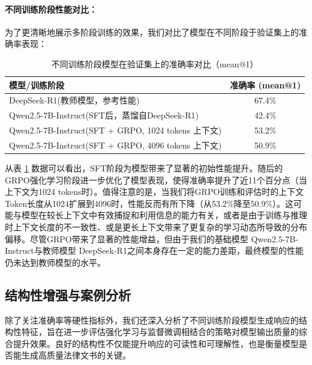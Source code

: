 \documentclass{article}
\newcommand{\qwen}{Qwen2.5-7B-Instruct}
\newcommand{\deepseekr}{DeepSeek-R1}
\newcommand{\qwen}{Qwen2.5-7B-Instruct}
\newcommand{\deepseekr}{DeepSeek-R1}
\begin{document}
\paragraph{不同训练阶段性能对比：}
为了更清晰地展示多阶段训练的效果，我们对比了模型在不同阶段于验证集上的准确率表现：

\begin{table}[h]
\centering
\caption{不同训练阶段模型在验证集上的准确率对比（mean@1）}
\label{tab:acc_distill_sft_grpo}
\begin{tabular}{l|c}
\hline
模型/训练阶段 & 准确率 (mean@1) \\
\hline
\deepseekr (教师模型，参考性能) & 67.4\% \\
\qwen (SFT后，蒸馏自\deepseekr) & 42.4\% \\
\qwen (SFT + GRPO, 1024 tokens 上下文) & 53.2\% \\
\qwen (SFT + GRPO, 4096 tokens 上下文) & 50.9\% \\
\hline
\end{tabular}
\end{table}

从表 \ref{tab:acc_distill_sft_grpo} 数据可以看出，SFT阶段为模型带来了显著的初始性能提升。随后的GRPO强化学习阶段进一步优化了模型表现，使得准确率提升了近11个百分点（当上下文为1024 tokens时）。值得注意的是，当我们将GRPO训练和评估时的上下文Token长度从1024扩展到4096时，性能反而有所下降（从53.2\%降至50.9\%）。这可能与模型在较长上下文中有效捕捉和利用信息的能力有关，或者是由于训练与推理时上下文长度的不一致性、或是更长上下文带来了更复杂的学习动态所导致的分布偏移。尽管GRPO带来了显著的性能增益，但由于我们的基础模型 \qwen 与教师模型 \deepseekr 之间本身存在一定的能力差距，最终模型的性能仍未达到教师模型的水平。

\subsection{结构性增强与案例分析}
除了关注准确率等硬性指标外，我们还深入分析了不同训练阶段模型生成响应的结构性特征，旨在进一步评估强化学习与监督微调相结合的策略对模型输出质量的综合提升效果。良好的结构性不仅能提升响应的可读性和可理解性，也是衡量模型是否能生成高质量法律文书的关键。
\end{document}
